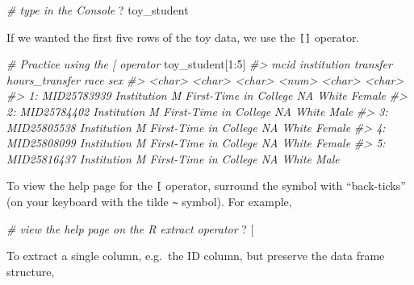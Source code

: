 \documentclass[
]{book}
\newenvironment{Shaded}{\begin{snugshade}}{\end{snugshade}}
\newcommand{\AttributeTok}[1]{\textcolor[rgb]{0.77,0.63,0.00}{#1}}
\newcommand{\CommentTok}[1]{\textcolor[rgb]{0.56,0.35,0.01}{\textit{#1}}}
\newcommand{\DecValTok}[1]{\textcolor[rgb]{0.00,0.00,0.81}{#1}}
\newcommand{\NormalTok}[1]{#1}
\newcommand{\SpecialCharTok}[1]{\textcolor[rgb]{0.00,0.00,0.00}{#1}}
\newcommand{\StringTok}[1]{\textcolor[rgb]{0.31,0.60,0.02}{#1}}
\begin{document}
\begin{Shaded}
\begin{Highlighting}[]
\CommentTok{\# type in the Console}
\NormalTok{? toy\_student}
\end{Highlighting}
\end{Shaded}

If we wanted the first five rows of the toy data, we use the \texttt{{[}{]}} operator.

\begin{Shaded}
\begin{Highlighting}[]
\CommentTok{\# Practice using the \textasciigrave{}[\textasciigrave{} operator}
\NormalTok{toy\_student[}\DecValTok{1}\SpecialCharTok{:}\DecValTok{5}\NormalTok{]}
\CommentTok{\#\textgreater{}           mcid   institution              transfer hours\_transfer   race    sex}
\CommentTok{\#\textgreater{}         \textless{}char\textgreater{}        \textless{}char\textgreater{}                \textless{}char\textgreater{}          \textless{}num\textgreater{} \textless{}char\textgreater{} \textless{}char\textgreater{}}
\CommentTok{\#\textgreater{} 1: MID25783939 Institution M First{-}Time in College             NA  White Female}
\CommentTok{\#\textgreater{} 2: MID25784402 Institution M First{-}Time in College             NA  White   Male}
\CommentTok{\#\textgreater{} 3: MID25805538 Institution M First{-}Time in College             NA  White Female}
\CommentTok{\#\textgreater{} 4: MID25808099 Institution M First{-}Time in College             NA  White Female}
\CommentTok{\#\textgreater{} 5: MID25816437 Institution M First{-}Time in College             NA  White   Male}
\end{Highlighting}
\end{Shaded}

To view the help page for the \texttt{{[}} operator, surround the symbol with ``back-ticks'' (on your keyboard with the tilde \texttt{\textasciitilde{}} symbol). For example,

\begin{Shaded}
\begin{Highlighting}[]
\CommentTok{\# view the help page on the R extract operator}
\NormalTok{? }\StringTok{\textasciigrave{}}\AttributeTok{[}\StringTok{\textasciigrave{}}
\end{Highlighting}
\end{Shaded}

To extract a single column, e.g.~the ID column, but preserve the data frame structure,
\end{document}
